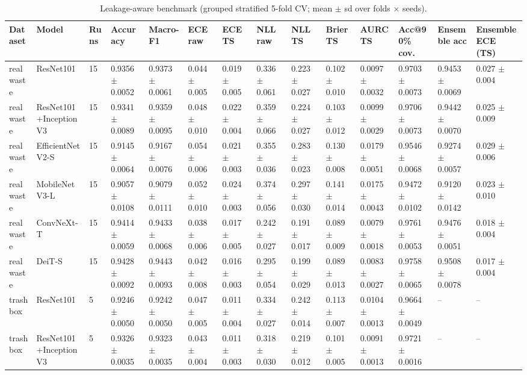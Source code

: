 \begin{table}[ht]
\centering
\small
\caption{Leakage-aware benchmark (grouped stratified 5-fold CV; mean $\pm$ sd over folds × seeds).}
\label{tab:tab3_main_benchmark}
\begin{tabular}{llllllllllllll}
\hline
Dataset & Model & Runs & Accuracy & Macro-F1 & ECE raw & ECE TS & NLL raw & NLL TS & Brier TS & AURC TS & Acc@90\% cov. & Ensemble acc & Ensemble ECE (TS) \\
\hline
realwaste & ResNet101 & 15 & 0.9356 $\pm$ 0.0052 & 0.9373 $\pm$ 0.0061 & 0.044 $\pm$ 0.005 & 0.019 $\pm$ 0.005 & 0.336 $\pm$ 0.061 & 0.223 $\pm$ 0.027 & 0.102 $\pm$ 0.010 & 0.0097 $\pm$ 0.0032 & 0.9703 $\pm$ 0.0073 & 0.9453 $\pm$ 0.0069 & 0.027 $\pm$ 0.004 \\
realwaste & ResNet101+InceptionV3 & 15 & 0.9341 $\pm$ 0.0089 & 0.9359 $\pm$ 0.0095 & 0.048 $\pm$ 0.010 & 0.022 $\pm$ 0.004 & 0.359 $\pm$ 0.066 & 0.224 $\pm$ 0.027 & 0.103 $\pm$ 0.012 & 0.0099 $\pm$ 0.0029 & 0.9706 $\pm$ 0.0073 & 0.9442 $\pm$ 0.0070 & 0.025 $\pm$ 0.009 \\
realwaste & EfficientNetV2-S & 15 & 0.9145 $\pm$ 0.0064 & 0.9167 $\pm$ 0.0076 & 0.054 $\pm$ 0.006 & 0.021 $\pm$ 0.003 & 0.355 $\pm$ 0.036 & 0.283 $\pm$ 0.023 & 0.130 $\pm$ 0.008 & 0.0179 $\pm$ 0.0051 & 0.9546 $\pm$ 0.0068 & 0.9274 $\pm$ 0.0057 & 0.029 $\pm$ 0.006 \\
realwaste & MobileNetV3-L & 15 & 0.9057 $\pm$ 0.0108 & 0.9079 $\pm$ 0.0111 & 0.052 $\pm$ 0.010 & 0.024 $\pm$ 0.003 & 0.374 $\pm$ 0.056 & 0.297 $\pm$ 0.030 & 0.141 $\pm$ 0.014 & 0.0175 $\pm$ 0.0043 & 0.9472 $\pm$ 0.0102 & 0.9120 $\pm$ 0.0142 & 0.023 $\pm$ 0.010 \\
realwaste & ConvNeXt-T & 15 & 0.9414 $\pm$ 0.0059 & 0.9433 $\pm$ 0.0068 & 0.038 $\pm$ 0.006 & 0.017 $\pm$ 0.005 & 0.242 $\pm$ 0.027 & 0.191 $\pm$ 0.017 & 0.089 $\pm$ 0.009 & 0.0079 $\pm$ 0.0018 & 0.9761 $\pm$ 0.0053 & 0.9476 $\pm$ 0.0051 & 0.018 $\pm$ 0.004 \\
realwaste & DeiT-S & 15 & 0.9428 $\pm$ 0.0092 & 0.9443 $\pm$ 0.0093 & 0.042 $\pm$ 0.008 & 0.016 $\pm$ 0.003 & 0.295 $\pm$ 0.054 & 0.199 $\pm$ 0.029 & 0.089 $\pm$ 0.013 & 0.0083 $\pm$ 0.0027 & 0.9758 $\pm$ 0.0065 & 0.9508 $\pm$ 0.0078 & 0.017 $\pm$ 0.004 \\
trashbox & ResNet101 & 5 & 0.9246 $\pm$ 0.0050 & 0.9242 $\pm$ 0.0050 & 0.047 $\pm$ 0.005 & 0.011 $\pm$ 0.004 & 0.334 $\pm$ 0.027 & 0.242 $\pm$ 0.014 & 0.113 $\pm$ 0.007 & 0.0104 $\pm$ 0.0013 & 0.9664 $\pm$ 0.0049 & – & – \\
trashbox & ResNet101+InceptionV3 & 5 & 0.9326 $\pm$ 0.0035 & 0.9323 $\pm$ 0.0035 & 0.043 $\pm$ 0.004 & 0.011 $\pm$ 0.003 & 0.318 $\pm$ 0.030 & 0.219 $\pm$ 0.012 & 0.101 $\pm$ 0.005 & 0.0091 $\pm$ 0.0013 & 0.9721 $\pm$ 0.0016 & – & – \\

\end{tabular}
\end{table}
